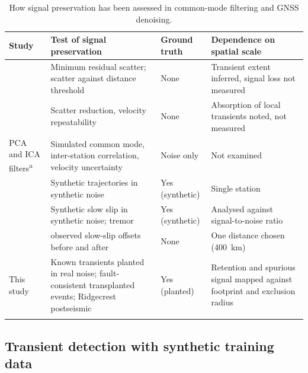 \documentclass[11pt,a4paper]{article}
\begin{document}
\begin{table}[ht]
\centering
\caption{How signal preservation has been assessed in common-mode filtering and GNSS denoising.}
\label{tab:assessment}
\small
\begin{tabular}{>{\raggedright\arraybackslash}p{3.0cm} >{\raggedright\arraybackslash}p{4.4cm} >{\raggedright\arraybackslash}p{2.2cm} >{\raggedright\arraybackslash}p{4.4cm}}
\toprule
Study & Test of signal preservation & Ground truth & Dependence on spatial scale \\
\midrule
\citet{tianshen2016} & Minimum residual scatter; scatter against distance threshold & None & Transient extent inferred, signal loss not measured \\
\citet{kreemer2021} & Scatter reduction, velocity repeatability & None & Absorption of local transients noted, not measured \\
PCA and ICA filters\textsuperscript{a} & Simulated common mode, inter-station correlation, velocity uncertainty & Noise only & Not examined \\
\citet{mastella2025} & Synthetic trajectories in synthetic noise & Yes (synthetic) & Single station \\
\citet{costantino2024} & Synthetic slow slip in synthetic noise; tremor & Yes (synthetic) & Analysed against signal-to-noise ratio \\
\citet{bachelot2025} & 280 observed slow-slip offsets before and after & None & One distance chosen (400~km) \\
This study & Known transients planted in real noise; fault-consistent transplanted events; Ridgecrest postseismic & Yes (planted) & Retention and spurious signal mapped against footprint and exclusion radius \\
\bottomrule
\multicolumn{4}{l}{\footnotesize \textsuperscript{a}\,\citet{shen2014,gruszczynski2018,li2020vbpca,zhou2022,liu2026}.}
\end{tabular}
\end{table}

\subsection{Transient detection with synthetic training data}
\end{document}
